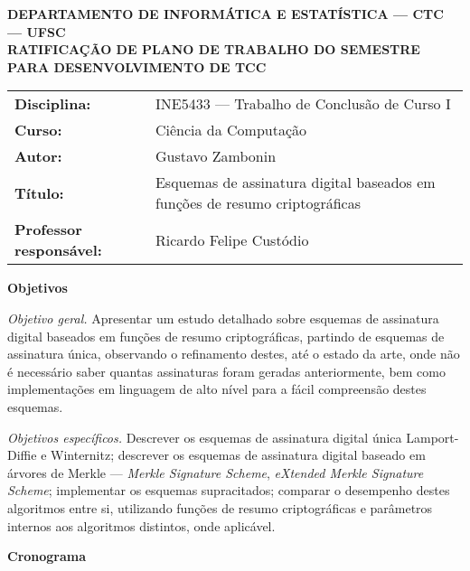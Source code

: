 \documentclass[11pt]{letter}
\begin{document}
\pagestyle{empty}

\begin{center}
  \textbf{
    DEPARTAMENTO DE INFORMÁTICA E ESTATÍSTICA --- CTC --- UFSC \\
    RATIFICAÇÃO DE PLANO DE TRABALHO DO SEMESTRE PARA DESENVOLVIMENTO DE TCC
  }
\end{center}

\vspace{1em}
\setlength\extrarowheight{5pt}
\begin{tabular}{l l}
  \textbf{Disciplina:}  & INE5433 --- Trabalho de Conclusão de Curso I  \\
  \textbf{Curso:}       & Ciência da Computação                         \\
  \textbf{Autor:}       & Gustavo Zambonin                              \\
  \textbf{Título:}      & Esquemas de assinatura digital baseados
                          em funções de resumo criptográficas           \\
  \textbf{Professor responsável:} & Ricardo Felipe Custódio             \\
\end{tabular}


\vspace{1em}
{\large \textbf{Objetivos}}

\noindent \emph{Objetivo geral.} Apresentar um estudo detalhado sobre esquemas
de assinatura digital baseados em funções de resumo criptográficas, partindo de
esquemas de assinatura única, observando o refinamento destes, até o estado da
arte, onde não é necessário saber quantas assinaturas foram geradas
anteriormente, bem como implementações em linguagem de alto nível para a fácil
compreensão destes esquemas.

\noindent \emph{Objetivos específicos.} Descrever os esquemas de assinatura
digital única Lamport-Diffie e Winternitz; descrever os esquemas de assinatura
digital baseado em árvores de Merkle --- \emph{Merkle Signature Scheme},
\emph{eXtended Merkle Signature Scheme}; implementar os esquemas supracitados;
comparar o desempenho destes algoritmos entre si, utilizando funções de resumo
criptográficas e parâmetros internos aos algoritmos distintos, onde aplicável.

\vspace{1em}
{\large \textbf{Cronograma}}
\end{document}
